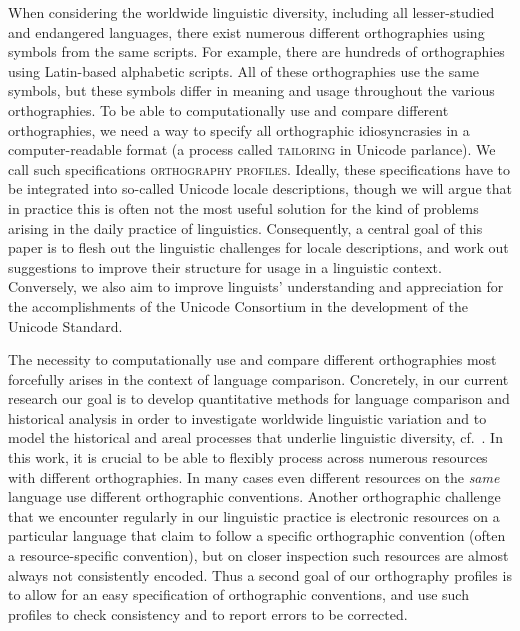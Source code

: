 When considering the worldwide linguistic diversity, including all
lesser-studied and endangered languages, there exist numerous different
orthographies using symbols from the same scripts. For example, there are
hundreds of orthographies using Latin-based alphabetic scripts. All of these
orthographies use the same symbols, but these symbols differ in meaning and
usage throughout the various orthographies. To be able to computationally use
and compare different orthographies, we need a way to specify all orthographic
idiosyncrasies in a computer-readable format (a process called
\textsc{tailoring} in Unicode parlance). We call such specifications
\textsc{orthography profiles}. Ideally, these specifications have to be
integrated into so-called Unicode locale descriptions, though we will argue that
in practice this is often not the most useful solution for the kind of problems
arising in the daily practice of linguistics. Consequently, a central goal of
this paper is to flesh out the linguistic challenges for locale descriptions,
and work out suggestions to improve their structure for usage in a linguistic
context. Conversely, we also aim to improve linguists' understanding and
appreciation for the accomplishments of the Unicode Consortium in the
development of the Unicode Standard.

The necessity to computationally use and compare different orthographies most
forcefully arises in the context of language comparison. Concretely, in our
current research our goal is to develop quantitative methods for language
comparison and historical analysis in order to investigate worldwide linguistic
variation and to model the historical and areal processes that underlie
linguistic diversity,
cf.~\citet{Steiner_etal2011,List2012,List2012a,ListMoran2013,MoranProkic2013}.
In this work, it is crucial to be able to flexibly process across numerous
resources with different orthographies. In many cases even different resources
on the \textit{same} language use different orthographic conventions. Another
orthographic challenge that we encounter regularly in our linguistic practice is
electronic resources on a particular language that claim to follow a specific
orthographic convention (often a resource-specific convention), but on closer
inspection such resources are almost always not consistently encoded. Thus a
second goal of our orthography profiles is to allow for an easy specification of
orthographic conventions, and use such profiles to check consistency and to
report errors to be corrected.

